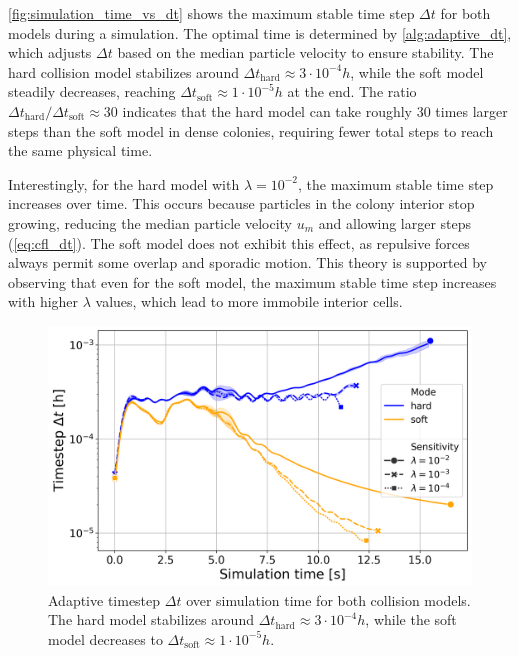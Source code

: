 \documentclass[conference]{IEEEtran}
\begin{document}
\autoref{fig:simulation_time_vs_dt} shows the maximum stable time step $\Delta t$ for both models during a simulation. The optimal time is determined by \autoref{alg:adaptive_dt}, which adjusts $\Delta t$ based on the median particle velocity to ensure stability. The hard collision model stabilizes around ${\Delta t}_{\text{hard}} \approx 3 \cdot 10^{-4} h$, while the soft model steadily decreases, reaching ${\Delta t}_{\text{soft}} \approx 1 \cdot 10^{-5} h$ at the end. The ratio ${\Delta t}_{\text{hard}}/{\Delta t}_{\text{soft}} \approx 30$ indicates that the hard model can take roughly 30 times larger steps than the soft model in dense colonies, requiring fewer total steps to reach the same physical time.

Interestingly, for the hard model with $\lambda=10^{-2}$, the maximum stable time step increases over time. This occurs because particles in the colony interior stop growing, reducing the median particle velocity $u_m$ and allowing larger steps (\autoref{eq:cfl_dt}). The soft model does not exhibit this effect, as repulsive forces always permit some overlap and sporadic motion. This theory is supported by observing that even for the soft model, the maximum stable time step increases with higher $\lambda$ values, which lead to more immobile interior cells.

\begin{figure}[H]
    \centering
    \includegraphics[width=\linewidth]{figures/comparison_plots/combined_simulation_time [s]_vs_dt.png}
    \caption{Adaptive timestep $\Delta t$ over simulation time for both collision models. The hard model stabilizes around ${\Delta t}_{\text{hard}} \approx 3 \cdot 10^{-4} h$, while the soft model decreases to ${\Delta t}_{\text{soft}} \approx 1 \cdot 10^{-5} h$.} \label{fig:simulation_time_vs_dt}
\end{figure}
\end{document}
